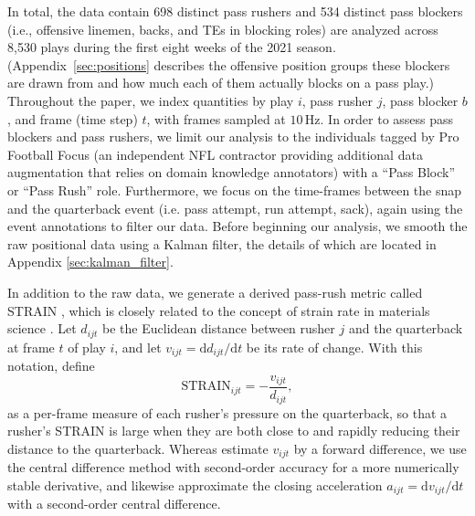 \documentclass[USenglish]{article}
\let\OldSubsection\subsection
\renewcommand{\subsection}{\FloatBarrier\OldSubsection}
\theoremstyle{dgthm}
\theoremstyle{dgdef}
\begin{document}
In total, the data contain 698 distinct pass rushers and 534 distinct pass blockers (i.e., offensive linemen, backs, and TEs in blocking roles) are analyzed across 8,530 plays during the first eight weeks of the 2021 season.  (Appendix~\ref{sec:positions} describes the offensive position groups these blockers are drawn from and how much each of them actually blocks on a pass play.) Throughout the paper, we index quantities by play $i$, pass rusher $j$, pass blocker $b$, and frame (time step) $t$, with frames sampled at $10$\,Hz. In order to assess pass blockers and pass rushers, we limit our analysis to the individuals tagged by Pro Football Focus (an independent NFL contractor providing additional data augmentation that relies on domain knowledge annotators) with a ``Pass Block'' or ``Pass Rush'' role. Furthermore, we focus on the time-frames between the snap and the quarterback event (i.e. pass attempt, run attempt, sack), again using the event annotations to filter our data. Before beginning our analysis, we smooth the raw positional data using a Kalman filter, the details of which are located in Appendix \ref{sec:kalman_filter}. 





In addition to the raw data, we generate a derived pass-rush metric called STRAIN \citep{nguyen2023here}, which is closely related to the concept of strain rate in materials science \citep{callister2018materials}.  Let $d_{ijt}$ be the Euclidean distance between rusher $j$ and the quarterback at frame $t$ of play $i$, and let $v_{ijt} = \mathrm{d}d_{ijt}/\mathrm{d}t$ be its rate of change. With this notation, \cite{nguyen2023here} define
\begin{equation}
\text{STRAIN}_{ijt} = - \frac{v_{ijt}}{d_{ijt}},
\end{equation}
as a per-frame measure of each rusher's pressure on the quarterback, so that a rusher's STRAIN is large when they are both close to and rapidly reducing their distance to the quarterback. Whereas \cite{nguyen2023here} estimate $v_{ijt}$ by a forward difference, we use the central difference method with second-order accuracy for a more numerically stable derivative, and likewise approximate the closing acceleration $a_{ijt} = \mathrm{d}v_{ijt}/\mathrm{d}t$ with a second-order central difference.
\end{document}
